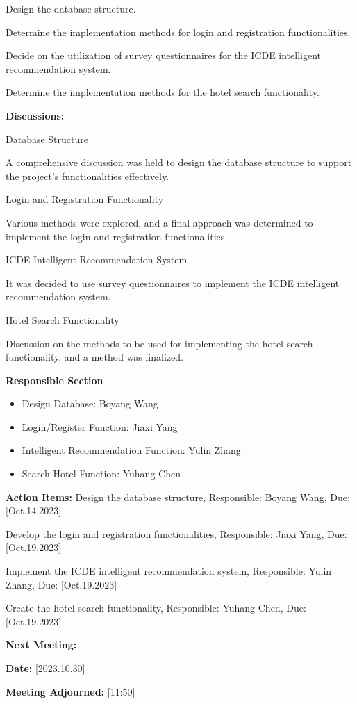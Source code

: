 \documentclass[conference]{IEEEtran}
\begin{document}
Design the database structure.

Determine the implementation methods for login and registration functionalities.

Decide on the utilization of survey questionnaires for the ICDE intelligent recommendation system.

Determine the implementation methods for the hotel search functionality.

\textbf{Discussions:}

Database Structure

A comprehensive discussion was held to design the database structure to support the project's functionalities effectively.

Login and Registration Functionality

Various methods were explored, and a final approach was determined to implement the login and registration functionalities.

ICDE Intelligent Recommendation System

It was decided to use survey questionnaires to implement the ICDE intelligent recommendation system.

Hotel Search Functionality

Discussion on the methods to be used for implementing the hotel search functionality, and a method was finalized.

\textbf{Responsible Section}
\begin{itemize}
\item Design Database: Boyang Wang
\item Login/Register Function: Jiaxi Yang
\item Intelligent Recommendation Function: Yulin Zhang
\item Search Hotel Function: Yuhang Chen
\end{itemize}
\textbf{Action Items:}
Design the database structure, Responsible: Boyang Wang, Due: [Oct.14.2023]

Develop the login and registration functionalities, Responsible: Jiaxi Yang, Due: [Oct.19.2023]

Implement the ICDE intelligent recommendation system, Responsible: Yulin Zhang, Due: [Oct.19.2023]

Create the hotel search functionality, Responsible: Yuhang Chen, Due: [Oct.19.2023]

\textbf{Next Meeting:}

\textbf{Date:} [2023.10.30]

\textbf{Meeting Adjourned:} [11:50]
\end{document}
